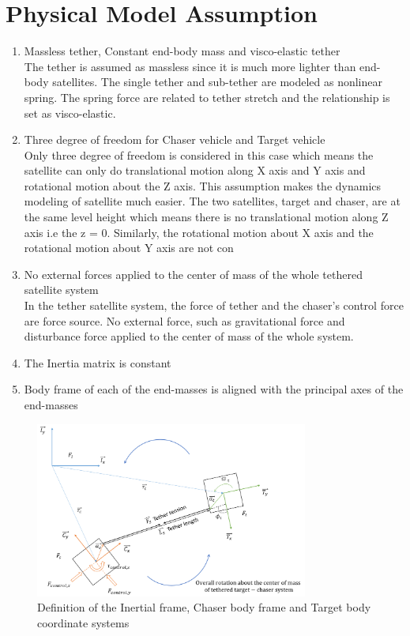 \section{Physical Model Assumption}

\begin{enumerate}
\label{simu-assumption}
\item Massless tether, Constant end-body mass and visco-elastic tether\\

The tether is assumed as massless since it is much more lighter than end-body satellites.  The single tether and sub-tether are modeled as nonlinear spring. The spring force are related to tether stretch and the relationship is set as visco-elastic.

\item Three degree of freedom for Chaser vehicle and Target vehicle\\

Only three degree of freedom is considered in this case which means the satellite can only do translational motion along X axis and Y axis and rotational motion about the Z axis. This assumption makes the dynamics modeling of satellite much easier. The two satellites, target and chaser, are at the same level height which means there is no translational motion along Z axis i.e the z = 0. Similarly, the rotational motion about X axis and the rotational motion about Y axis are not con
\item No external forces applied to the center of mass of the whole tethered satellite system\\

In the tether satellite system, the force of tether and the chaser's control force are force source. No external force, such as gravitational force and disturbance force applied to the center of mass of the whole system. 
\item The Inertia matrix is constant

\item Body frame of each of the end-masses is aligned with the principal axes of the end-masses
\end{enumerate}

\begin{figure}[ht]
\centering
\includegraphics[width = 0.8\textwidth,right]{fig/simulation/illustration.png}
\caption{Definition of the Inertial frame, Chaser body frame and Target body coordinate systems}\label{simu-illustration}
\end{figure}


